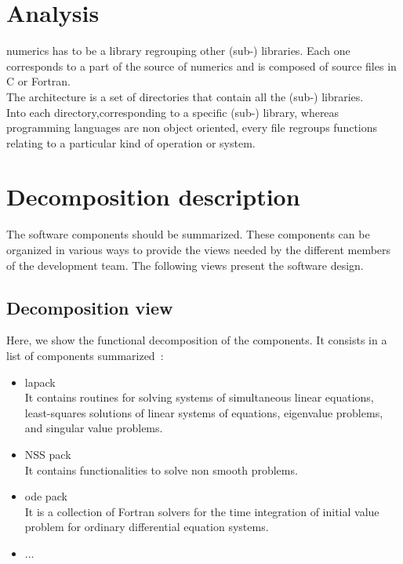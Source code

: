 \section{Analysis}
\ac{numerics} has to be a library regrouping other (sub-) libraries. Each one corresponds to a part of the source of \ac{numerics} and is composed of source files in C or Fortran.\\
The architecture is a set of directories that contain all the (sub-) libraries.\\
Into each directory,corresponding to a specific (sub-) library, whereas programming languages are non object oriented, every file regroups functions relating to a particular kind of operation or system.

\section{Decomposition description}
The software components should be summarized. These components can be organized in various ways to provide the
views needed by the different members of the development team. The following views present the software
design.

\subsection{Decomposition view}
Here, we show the functional decomposition of the components. It consists in a list of components summarized~:
 
\begin{itemize}
		\item \ac{lapack}\\
		It contains routines for solving systems of simultaneous linear equations, least-squares solutions of linear systems of equations, eigenvalue problems, and singular value problems.

        \item NSS pack\\
		It contains functionalities to solve non smooth problems.
		
        \item \ac{ode} pack\\
		It is a collection of Fortran solvers for the time integration of initial value problem for ordinary differential equation systems.

        \item ...\\
\end{itemize}

